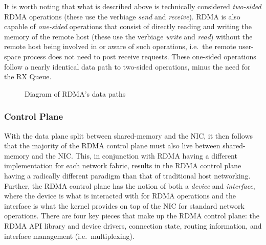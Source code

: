 \documentclass[12pt,titlepage]{article}
\begin{document}
It is worth noting that what is described above is technically considered \textit{two-sided} RDMA operations (these use the verbiage \textit{send} and \textit{receive}).
RDMA is also capable of \textit{one-sided} operations that consist of directly reading and writing the memory of the remote host (these use the verbiage \textit{write} and \textit{read}) without the remote host being involved in or aware of such operations, i.e.\ the remote user-space process does not need to post receive requests.
These one-sided operations follow a nearly identical data path to two-sided operations, minus the need for the RX Queue.

\begin{figure}
	\resizebox{\linewidth}{!}{
		\begin{tikzpicture}[x=0.75pt,y=0.75pt,yscale=-1,xscale=1]
			
		\end{tikzpicture}
	}
	\caption{Diagram of RDMA's data paths}
\end{figure}

\subsubsection{Control Plane}\label{subsubsec:Control Plane}
With the data plane split between shared-memory and the NIC, it then follows that the majority of the RDMA control plane must also live between shared-memory and the NIC\@.
This, in conjunction with RDMA having a different implementation for each network fabric, results in the RDMA control plane having a radically different paradigm than that of traditional host networking.
Further, the RDMA control plane has the notion of both a \textit{device} and \textit{interface}, where the device is what is interacted with for RDMA operations and the interface is what the kernel provides on top of the NIC for standard network operations.
There are four key pieces that make up the RDMA control plane: the RDMA API library and device drivers, connection state, routing information, and interface management (i.e.\ multiplexing).
\end{document}
